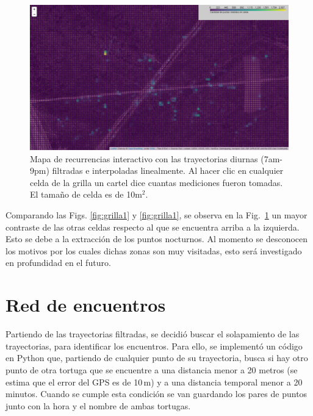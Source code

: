 \begin{figure}[ht]
    \begin{center}
       
   
    \includegraphics[width=\imsize]{Chap2/GrillaCintSNoche.png}
\end{center}
    \caption[Mapa con zonas de recurrencia para trayectorias diurnas.]{Mapa de recurrencias  interactivo con las trayectorias diurnas (7am-9pm) filtradas e interpoladas linealmente. Al hacer clic en cualquier celda de la grilla un cartel dice cuantas mediciones fueron tomadas. El tamaño de celda es de 10m$^2$.}
    \label{fig:grillaInt}
\end{figure}
 
 
Comparando las Figs. \ref{fig:grilla1} y \ref{fig:grilla1}, se observa en la  Fig.~\ref{fig:grillaInt} un mayor contraste de las otras celdas respecto al que se encuentra arriba a la izquierda. Esto se debe a la extracción de los puntos nocturnos. Al momento se desconocen los motivos por los cuales dichas zonas son muy visitadas, esto será investigado en profundidad en el futuro.
 
\section{Red de encuentros}
Partiendo de las trayectorias filtradas, se decidió buscar el solapamiento de las trayectorias, para identificar los encuentros. Para ello, se implementó un código en Python que, partiendo de cualquier punto de su trayectoria, busca si hay otro punto de otra tortuga que se encuentre a una distancia menor a 20 metros (se estima que el error del GPS es de 10\,m) y a una distancia temporal menor a 20 minutos. Cuando se cumple esta condición se van guardando los pares de puntos junto con la hora y el nombre de ambas tortugas.
 
